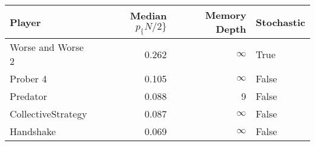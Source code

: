 \begin{tabular}{lrrl}
\toprule
             Player &  Median $p_\{N/2\}$ &  Memory Depth & Stochastic \\
\midrule
  Worse and Worse 2 &             0.262 &            \(\infty\) &       True \\
           Prober 4 &             0.105 &            \(\infty\) &      False \\
           Predator &             0.088 &             9 &      False \\
 CollectiveStrategy &             0.087 &            \(\infty\) &      False \\
          Handshake &             0.069 &            \(\infty\) &      False \\
\bottomrule
\end{tabular}
